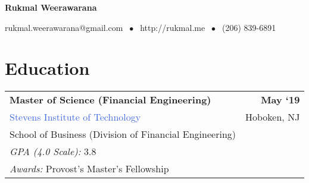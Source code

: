 \documentclass[10pt]{article}
\newcommand{\highlightcolor}{RoyalBlue}
\newcommand{\tabularxwidth}{\textwidth}
\begin{document}
    \centerline{ \color{\highlightcolor} \huge \textbf{Rukmal Weerawarana}}

    \vspace{.5em}

    {\color{\highlightcolor} \centerline{rukmal.weerawarana@gmail.com $\; \bullet \;$ http://rukmal.me $\; \bullet \;$ (206) 839-6891} }

    \noindent{\rule{\linewidth}{.2em}}



    
        \section{Education}

    
        \begin{tabularx}{\tabularxwidth}{X r}
            \textbf{Master of Science (Financial Engineering)} & \textbf{
    May ‘19} \\
            \quad \textcolor{\highlightcolor}{Stevens Institute of Technology} & 
    Hoboken, 
        NJ \\
            \quad School of Business (Division of Financial Engineering) & \\
            
                \quad \textit{GPA (4.0 Scale):} 3.8 & \\
            
            
                
                    
                        \quad \textit{Awards:} 
    Provost's Master's Fellowship & \\
                    
                
                    
                
                    
                
            
        \end{tabularx}

        
\end{document}
